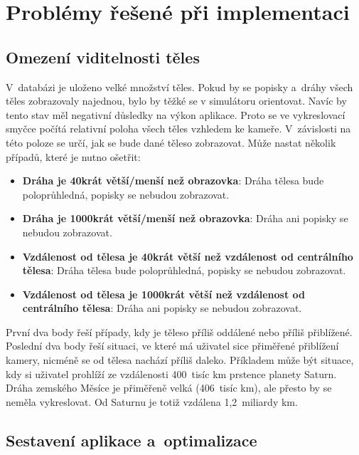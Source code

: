 \documentclass[a4paper,12pt]{article}
\begin{document}
\section{Problémy řešené při implementaci}

\subsection{Omezení viditelnosti těles}

V~databázi je uloženo velké množství těles. Pokud by se popisky a~dráhy všech těles zobrazovaly najednou, bylo by těžké se v simulátoru orientovat. Navíc by tento stav měl negativní důsledky na výkon aplikace. Proto se ve vykreslovací smyčce počítá relativní poloha všech těles vzhledem ke kameře. V~závislosti na této poloze se určí, jak se bude dané těleso zobrazovat. Může nastat několik případů, které je nutno ošetřit:

\begin{itemize}
\item \textbf{Dráha je 40krát větší/menší než obrazovka}: Dráha tělesa bude poloprůhledná, popisky se nebudou zobrazovat.
\item \textbf{Dráha je 1000krát větší/menší než obrazovka}: Dráha ani popisky se nebudou zobrazovat.
\item \textbf{Vzdálenost od tělesa je 40krát větší než vzdálenost od centrálního tělesa}: Dráha tělesa bude poloprůhledná, popisky se nebudou zobrazovat.
\item \textbf{Vzdálenost od tělesa je 1000krát větší než vzdálenost od centrálního tělesa}: Dráha ani popisky se nebudou zobrazovat.
\end{itemize} 

První dva body řeší případy, kdy je těleso příliš oddálené nebo příliš přiblížené. Poslední dva body řeší situaci, ve které má uživatel sice přiměřené přiblížení kamery, nicméně se od tělesa nachází příliš daleko. Příkladem může být situace, kdy si uživatel prohlíží ze vzdálenosti 400~tisíc km prstence planety Saturn. Dráha zemského Měsíce je přiměřeně velká (406~tisíc km), ale přesto by se neměla vykreslovat. Od Saturnu je totiž vzdálena 1,2~miliardy km.~\cite{rees}

\subsection{Sestavení aplikace a~optimalizace}
\end{document}
